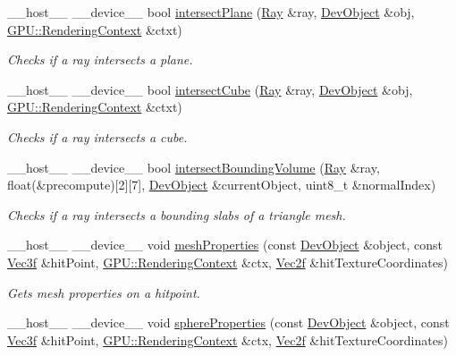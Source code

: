 \begin{DoxyCompactItemize}
\item 
\+\_\+\+\_\+host\+\_\+\+\_\+ \+\_\+\+\_\+device\+\_\+\+\_\+ bool \hyperlink{group__intersection__test__prperties_gafbcfd99d540347f9f63d01d6d0b6eef5}{intersect\+Plane} (\hyperlink{class_ray}{Ray} \&ray, \hyperlink{class_dev_object}{Dev\+Object} \&obj, \hyperlink{struct_g_p_u_1_1_rendering_context}{G\+P\+U\+::\+Rendering\+Context} \&ctxt)
\begin{DoxyCompactList}\small\item\em Checks if a ray intersects a plane. \end{DoxyCompactList}\item 
\+\_\+\+\_\+host\+\_\+\+\_\+ \+\_\+\+\_\+device\+\_\+\+\_\+ bool \hyperlink{group__intersection__test__prperties_gae4778d3b0c160c9757d7fca0e5deefa2}{intersect\+Cube} (\hyperlink{class_ray}{Ray} \&ray, \hyperlink{class_dev_object}{Dev\+Object} \&obj, \hyperlink{struct_g_p_u_1_1_rendering_context}{G\+P\+U\+::\+Rendering\+Context} \&ctxt)
\begin{DoxyCompactList}\small\item\em Checks if a ray intersects a cube. \end{DoxyCompactList}\item 
\+\_\+\+\_\+host\+\_\+\+\_\+ \+\_\+\+\_\+device\+\_\+\+\_\+ bool \hyperlink{group__intersection__test__prperties_gaf6bbee9e8a6ee564017fa94cd9e6ec63}{intersect\+Bounding\+Volume} (\hyperlink{class_ray}{Ray} \&ray, float(\&precompute)\mbox{[}2\mbox{]}\mbox{[}7\mbox{]}, \hyperlink{class_dev_object}{Dev\+Object} \&current\+Object, uint8\+\_\+t \&normal\+Index)
\begin{DoxyCompactList}\small\item\em Checks if a ray intersects a bounding slabs of a triangle mesh. \end{DoxyCompactList}\item 
\+\_\+\+\_\+host\+\_\+\+\_\+ \+\_\+\+\_\+device\+\_\+\+\_\+ void \hyperlink{group__intersection__test__prperties_gaa26e85d7aac46c25d6a1b975423f968d}{mesh\+Properties} (const \hyperlink{class_dev_object}{Dev\+Object} \&object, const \hyperlink{class_vec3}{Vec3f} \&hit\+Point, \hyperlink{struct_g_p_u_1_1_rendering_context}{G\+P\+U\+::\+Rendering\+Context} \&ctx, \hyperlink{class_vec2}{Vec2f} \&hit\+Texture\+Coordinates)
\begin{DoxyCompactList}\small\item\em Gets mesh properties on a hitpoint. \end{DoxyCompactList}\item 
\+\_\+\+\_\+host\+\_\+\+\_\+ \+\_\+\+\_\+device\+\_\+\+\_\+ void \hyperlink{group__intersection__test__prperties_gae821d5671069271f7c39d22ca8950f3d}{sphere\+Properties} (const \hyperlink{class_dev_object}{Dev\+Object} \&object, const \hyperlink{class_vec3}{Vec3f} \&hit\+Point, \hyperlink{struct_g_p_u_1_1_rendering_context}{G\+P\+U\+::\+Rendering\+Context} \&ctx, \hyperlink{class_vec2}{Vec2f} \&hit\+Texture\+Coordinates)

\end{DoxyCompactItemize}

